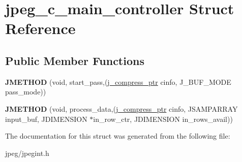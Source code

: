 \hypertarget{structjpeg__c__main__controller}{}\section{jpeg\+\_\+c\+\_\+main\+\_\+controller Struct Reference}
\label{structjpeg__c__main__controller}
\subsection*{Public Member Functions}
\begin{DoxyCompactItemize}
\item 
{\bfseries J\+M\+E\+T\+H\+OD} (void, start\+\_\+pass,(\hyperlink{structjpeg__compress__struct}{j\+\_\+compress\+\_\+ptr} cinfo, J\+\_\+\+B\+U\+F\+\_\+\+M\+O\+DE pass\+\_\+mode))\hypertarget{structjpeg__c__main__controller_a12d7c719a1598e04dafbddc0c3d6c1d5}{}\label{structjpeg__c__main__controller_a12d7c719a1598e04dafbddc0c3d6c1d5}

\item 
{\bfseries J\+M\+E\+T\+H\+OD} (void, process\+\_\+data,(\hyperlink{structjpeg__compress__struct}{j\+\_\+compress\+\_\+ptr} cinfo,                   J\+S\+A\+M\+P\+A\+R\+R\+AY input\+\_\+buf, J\+D\+I\+M\+E\+N\+S\+I\+ON $\ast$in\+\_\+row\+\_\+ctr,                   J\+D\+I\+M\+E\+N\+S\+I\+ON in\+\_\+rows\+\_\+avail))\hypertarget{structjpeg__c__main__controller_a54e7678e7a6c3f1ccde0190891fe93c1}{}\label{structjpeg__c__main__controller_a54e7678e7a6c3f1ccde0190891fe93c1}

\end{DoxyCompactItemize}


The documentation for this struct was generated from the following file\+:\begin{DoxyCompactItemize}
\item 
jpeg/jpegint.\+h\end{DoxyCompactItemize}
